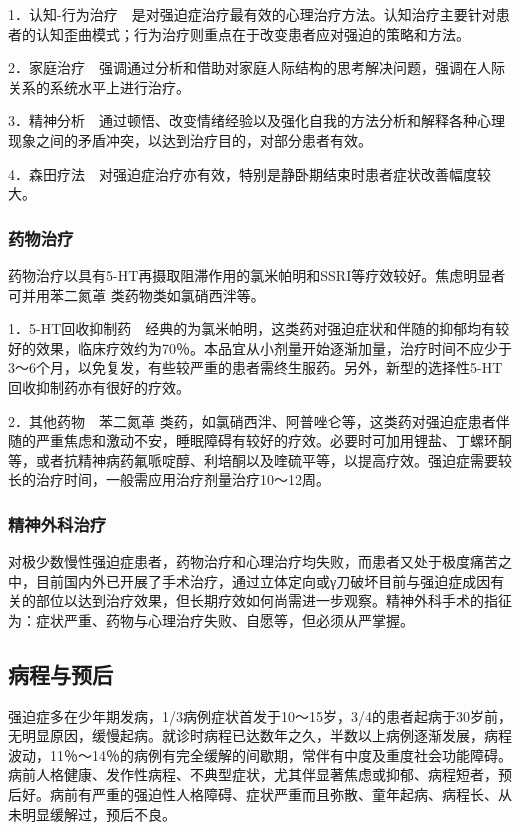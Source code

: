 1．认知-行为治疗　是对强迫症治疗最有效的心理治疗方法。认知治疗主要针对患者的认知歪曲模式；行为治疗则重点在于改变患者应对强迫的策略和方法。

2．家庭治疗　强调通过分析和借助对家庭人际结构的思考解决问题，强调在人际关系的系统水平上进行治疗。

3．精神分析　通过顿悟、改变情绪经验以及强化自我的方法分析和解释各种心理现象之间的矛盾冲突，以达到治疗目的，对部分患者有效。

4．森田疗法　对强迫症治疗亦有效，特别是静卧期结束时患者症状改善幅度较大。

\subsubsection{药物治疗}

药物治疗以具有5-HT再摄取阻滞作用的氯米帕明和SSRI等疗效较好。焦虑明显者可并用苯二氮䓬
类药物类如氯硝西泮等。

1．5-HT回收抑制药　经典的为氯米帕明，这类药对强迫症状和伴随的抑郁均有较好的效果，临床疗效约为70％。本品宜从小剂量开始逐渐加量，治疗时间不应少于3～6个月，以免复发，有些较严重的患者需终生服药。另外，新型的选择性5-HT回收抑制药亦有很好的疗效。

2．其他药物　苯二氮䓬
类药，如氯硝西泮、阿普唑仑等，这类药对强迫症患者伴随的严重焦虑和激动不安，睡眠障碍有较好的疗效。必要时可加用锂盐、丁螺环酮等，或者抗精神病药氟哌啶醇、利培酮以及喹硫平等，以提高疗效。强迫症需要较长的治疗时间，一般需应用治疗剂量治疗10～12周。

\subsubsection{精神外科治疗}

对极少数慢性强迫症患者，药物治疗和心理治疗均失败，而患者又处于极度痛苦之中，目前国内外已开展了手术治疗，通过立体定向或γ刀破坏目前与强迫症成因有关的部位以达到治疗效果，但长期疗效如何尚需进一步观察。精神外科手术的指征为：症状严重、药物与心理治疗失败、自愿等，但必须从严掌握。

\subsection{病程与预后}

强迫症多在少年期发病，1/3病例症状首发于10～15岁，3/4的患者起病于30岁前，无明显原因，缓慢起病。就诊时病程已达数年之久，半数以上病例逐渐发展，病程波动，11％～14％的病例有完全缓解的间歇期，常伴有中度及重度社会功能障碍。病前人格健康、发作性病程、不典型症状，尤其伴显著焦虑或抑郁、病程短者，预后好。病前有严重的强迫性人格障碍、症状严重而且弥散、童年起病、病程长、从未明显缓解过，预后不良。

